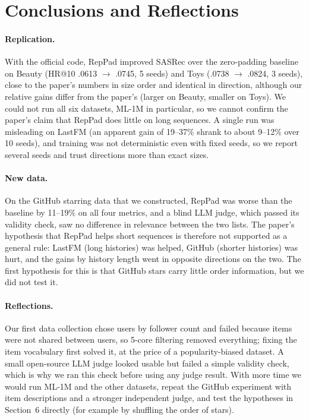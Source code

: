 \documentclass[11pt]{article}
\begin{document}
\section{Conclusions and Reflections}

\paragraph{Replication.}
With the official code, RepPad improved SASRec over the zero-padding baseline on Beauty (HR@10 .0613
$\to$ .0745, 5 seeds) and Toys (.0738 $\to$ .0824, 3 seeds), close to the paper's numbers in size
order and identical in direction, although our relative gains differ from the paper's (larger on Beauty,
smaller on Toys). We could not run all six datasets, ML-1M in particular, so we cannot confirm the paper's
claim that RepPad does little on long sequences. A single run was misleading on LastFM (an apparent gain of
19--37\% shrank to about 9--12\% over 10 seeds), and training was not deterministic even with fixed seeds,
so we report several seeds and trust directions more than exact sizes.

\paragraph{New data.}
On the GitHub starring data that we constructed, RepPad was worse than the baseline by 11--19\% on all
four metrics, and a blind LLM judge, which passed its validity check, saw no difference in relevance between the two lists.
The paper's hypothesis that RepPad helps short sequences is therefore not supported as a general rule:
LastFM (long histories) was helped, GitHub (shorter histories) was hurt, and the gains by history length went in
opposite directions on the two. The first hypothesis for this is that GitHub stars carry little order information,
but we did not test it.

\paragraph{Reflections.}
Our first data collection chose users by follower count and failed because items were not shared between users, so
5-core filtering removed everything; fixing the item vocabulary first solved it, at the price of a popularity-biased
dataset. A small open-source LLM judge looked usable but failed a simple validity check, which is why we
ran this check before using any judge result. With more time we would run ML-1M and the other
datasets, repeat the GitHub experiment with item descriptions and a stronger independent judge, and test the
hypotheses in Section~6 directly (for example by shuffling the order of stars).
\end{document}
